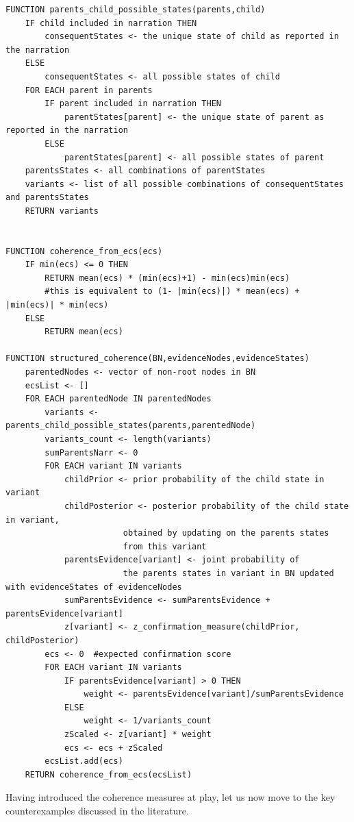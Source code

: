\documentclass[
  10pt,
]{scrartcl}
\begin{document}
\begin{verbatim}
FUNCTION parents_child_possible_states(parents,child)
    IF child included in narration THEN
        consequentStates <- the unique state of child as reported in the narration
    ELSE
        consequentStates <- all possible states of child
    FOR EACH parent in parents
        IF parent included in narration THEN
            parentStates[parent] <- the unique state of parent as reported in the narration
        ELSE
            parentStates[parent] <- all possible states of parent
    parentsStates <- all combinations of parentStates
    variants <- list of all possible combinations of consequentStates and parentsStates
    RETURN variants


FUNCTION coherence_from_ecs(ecs)
    IF min(ecs) <= 0 THEN
        RETURN mean(ecs) * (min(ecs)+1) - min(ecs)min(ecs)
        #this is equivalent to (1- |min(ecs)|) * mean(ecs) + |min(ecs)| * min(ecs)
    ELSE
        RETURN mean(ecs)

FUNCTION structured_coherence(BN,evidenceNodes,evidenceStates)
    parentedNodes <- vector of non-root nodes in BN
    ecsList <- []
    FOR EACH parentedNode IN parentedNodes
        variants <- parents_child_possible_states(parents,parentedNode)
        variants_count <- length(variants)
        sumParentsNarr <- 0
        FOR EACH variant IN variants
            childPrior <- prior probability of the child state in variant
            childPosterior <- posterior probability of the child state in variant,
                        obtained by updating on the parents states
                        from this variant
            parentsEvidence[variant] <- joint probability of 
                        the parents states in variant in BN updated with evidenceStates of evidenceNodes
            sumParentsEvidence <- sumParentsEvidence +  parentsEvidence[variant] 
            z[variant] <- z_confirmation_measure(childPrior, childPosterior)
        ecs <- 0  #expected confirmation score
        FOR EACH variant IN variants
            IF parentsEvidence[variant] > 0 THEN
                weight <- parentsEvidence[variant]/sumParentsEvidence
            ELSE
                weight <- 1/variants_count
            zScaled <- z[variant] * weight
            ecs <- ecs + zScaled
        ecsList.add(ecs)
    RETURN coherence_from_ecs(ecsList)
\end{verbatim}

\normalsize

\noindent Having introduced the coherence measures at play, let us now move to the key counterexamples discussed in the literature.
\end{document}
